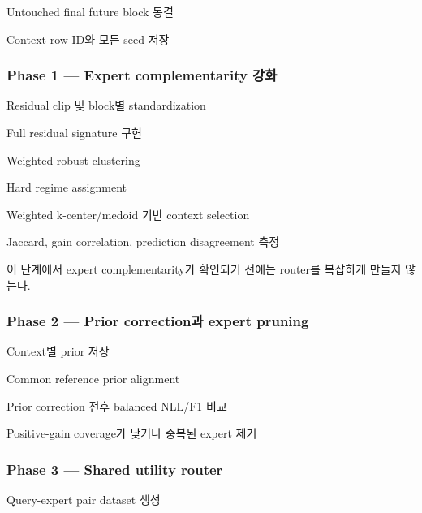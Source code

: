 \par\noindent \textbullet\enspace Untouched final future block 동결


\par\noindent \textbullet\enspace Context row ID와 모든 seed 저장


\subsubsection{Phase 1 — Expert complementarity 강화}
\par\noindent \textbullet\enspace Residual clip 및 block별 standardization


\par\noindent \textbullet\enspace Full residual signature 구현


\par\noindent \textbullet\enspace Weighted robust clustering


\par\noindent \textbullet\enspace Hard regime assignment


\par\noindent \textbullet\enspace Weighted k-center/\allowbreak{}medoid 기반 context selection


\par\noindent \textbullet\enspace Jaccard, gain correlation, prediction disagreement 측정


이 단계에서 expert complementarity가 확인되기 전에는 router를 복잡하게 만들지 않는다.

\subsubsection{Phase 2 — Prior correction과 expert pruning}
\par\noindent \textbullet\enspace Context별 prior 저장


\par\noindent \textbullet\enspace Common reference prior alignment


\par\noindent \textbullet\enspace Prior correction 전후 balanced NLL/\allowbreak{}F1 비교


\par\noindent \textbullet\enspace Positive-gain coverage가 낮거나 중복된 expert 제거


\subsubsection{Phase 3 — Shared utility router}
\par\noindent \textbullet\enspace Query-expert pair dataset 생성


